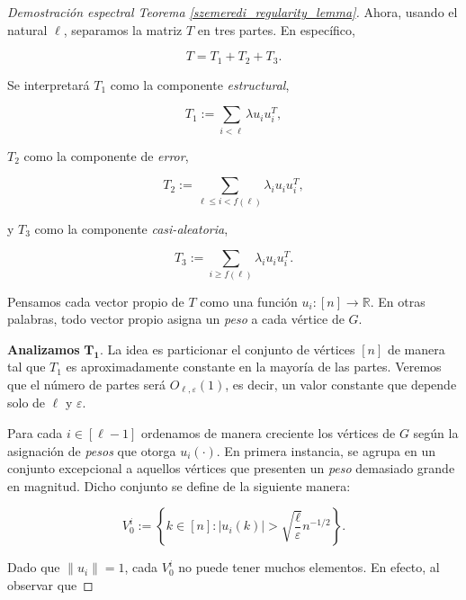 \documentclass{article}[14pts]
\providecommand{\norm}[1]{\lVert#1\rVert}
\providecommand{\norm}[1]{\lVert#1\rVert}
\let\varepsilon=\varepsilon
\begin{document}
\begin{proof}[Demostración espectral Teorema \ref{szemeredi_regularity_lemma}]
    Ahora, usando el natural $\ell$, separamos la matriz $T$ en tres partes. En específico,\medskip

    \begin{equation*}
        T = T_1 + T_2 + T_3.
    \end{equation*}\medskip

    Se interpretará $T_1$ como la componente \emph{estructural},\medskip

    \begin{equation*}
        T_1 := \sum_{i < \ell} \lambda u_i u_{i}^{T},
    \end{equation*}\medskip

    $T_2$ como la componente de \emph{error},\medskip

    \begin{equation*}
        T_2 := \sum_{\ell \leq i < f(\ell)} \lambda_i u_i u_{i}^{T},
    \end{equation*}\medskip

    y $T_3$ como la componente \emph{casi-aleatoria},\medskip

    \begin{equation*}
        T_3 := \sum_{i \geq f(\ell)} \lambda_i u_i u_{i}^{T}.
    \end{equation*}\medskip

    Pensamos cada vector propio de $T$ como una función $u_i : [n]\to \mathbb{R}$. En otras palabras, todo vector propio asigna un \emph{peso} a cada vértice de $G$.\medskip

    \textbf{Analizamos} $\mathbf{T_1}$. La idea es particionar el conjunto de vértices $[n]$ de manera tal que $T_1$ es aproximadamente constante en la mayoría de las partes. Veremos que el número de partes será $O_{\ell, \varepsilon}(1)$, es decir, un valor constante que depende solo de $\ell$ y $\varepsilon$.\medskip

    Para cada $i\in [\ell - 1]$ ordenamos de manera creciente los vértices de $G$ según la asignación de \emph{pesos} que otorga $u_i (\cdot)$. En primera instancia, se agrupa en un conjunto excepcional a aquellos vértices que presenten un \emph{peso} demasiado grande en magnitud. Dicho conjunto se define de la siguiente manera:\medskip

    \begin{equation*}
        V_{0}^{i} := \left\lbrace k\in [n]: |u_i (k)| > \sqrt{\frac{\ell}{\varepsilon}} n^{-1/2}\right\rbrace.
    \end{equation*}\medskip

    Dado que $\norm{u_i} = 1$, cada $V_{0}^{i}$ no puede tener muchos elementos. En efecto, al observar que\medskip


\end{proof}
\end{document}
